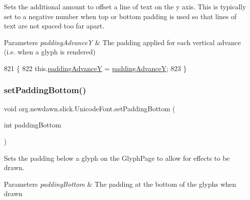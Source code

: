 Sets the additional amount to offset a line of text on the y axis. This is typically set to a negative number when top or bottom padding is used so that lines of text are not spaced too far apart.


\begin{DoxyParams}{Parameters}
{\em padding\+AdvanceY} & The padding applied for each vertical advance (i.\+e. when a glyph is rendered) \\
\hline
\end{DoxyParams}

\begin{DoxyCode}
821                                                          \{
822         this.\mbox{\hyperlink{classorg_1_1newdawn_1_1slick_1_1_unicode_font_ac04c92b5304822a4187a2e7184f4aca8}{paddingAdvanceY}} = \mbox{\hyperlink{classorg_1_1newdawn_1_1slick_1_1_unicode_font_ac04c92b5304822a4187a2e7184f4aca8}{paddingAdvanceY}};
823     \}
\end{DoxyCode}
\mbox{\label{classorg_1_1newdawn_1_1slick_1_1_unicode_font_aac0bf22d918803bfd351a6b06aac7f5e}} 
\subsubsection{\texorpdfstring{set\+Padding\+Bottom()}{setPaddingBottom()}}
{\footnotesize\ttfamily void org.\+newdawn.\+slick.\+Unicode\+Font.\+set\+Padding\+Bottom (\begin{DoxyParamCaption}\item[{int}]{padding\+Bottom }\end{DoxyParamCaption})\hspace{0.3cm}{\ttfamily [inline]}}

Sets the padding below a glyph on the Glyph\+Page to allow for effects to be drawn.


\begin{DoxyParams}{Parameters}
{\em padding\+Bottom} & The padding at the bottom of the glyphs when drawn \\
\hline
\end{DoxyParams}

